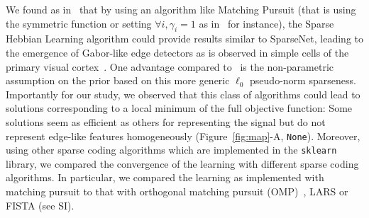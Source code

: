 \documentclass[vision,article,submit,oneauthor,pdftex]{Definitions/mdpi}
\newcommand{\coef}{\mathbf{a}} %
\newcommand{\image}{\mathbf{y}} %
\newcommand{\dico}{\Phi} %
\newcommand{\eqdef}{\ensuremath{\stackrel{\mbox{\upshape\tiny def.}}{=}}}
\newcommand{\seeFig}[1]{Figure~\ref{fig:#1}}%
\begin{document}
We found as in~\citep{Rehn07} that by using an algorithm like Matching Pursuit (that is using the symmetric function or setting $\forall i, \gamma_i=1$ as in~\citep{Mairal14} for instance), the Sparse Hebbian Learning algorithm could provide results similar to {\sc SparseNet}, leading to the emergence of Gabor-like edge detectors as is observed in simple cells of the primary visual cortex~\citep{Fischer07}. One advantage compared to~\citep{Olshausen97} is the non-parametric assumption on the prior based on this more generic $\ell_0$ pseudo-norm sparseness. Importantly for our study, we observed that this class of algorithms could lead to solutions corresponding to a local minimum of the full objective function: Some solutions seem as efficient as others for representing the signal but do not represent edge-like features homogeneously (\seeFig{map}-A, \texttt{None}). %
Moreover, using other sparse coding algorithms which are implemented in the \verb+sklearn+ library, we compared the convergence of the learning with different sparse coding algorithms. In particular, we compared the learning as implemented with matching pursuit to that with orthogonal matching pursuit (OMP)~\citep{pati1993orthogonal}, LARS or FISTA (see SI). %
\end{document}
